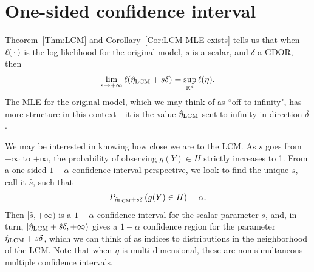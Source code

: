 \section{One-sided confidence interval} \label{S:CI}
Theorem~\ref{Thm:LCM} and Corollary~\ref{Cor:LCM MLE exists} 
tells us that when $\ell(\,\cdot\,)$ is the log likelihood for the original model,
$s$ is a scalar, and $\delta$ a GDOR, then
\begin{align*}
	\lim_{s \to +\infty} \ell(\hat{\eta}_{\textrm{LCM}} + s\delta) = \sup_{{\mathbb R}^d} \ell(\eta).
\end{align*}
The MLE for the original model, which we may think of as ``off to infinity", has
more structure in this context---it is the value $\hat{\eta}_{\textrm{LCM}}$ sent to 
infinity in direction $\delta$.

We may be interested in knowing how close we are to the LCM.
As $s$ goes from $-\infty$ to $+\infty$, the probability of observing 
$g(Y) \in H$ strictly increases to 1.  
From a one-sided $1-\alpha$ confidence interval perspective, 
we look to find the unique $s$, 
call it $\hat{s}$, such that
\begin{align*}
	P_{\hat{\eta}_{\textrm{LCM}} + s\delta}\left (g(Y) \in H \right ) = \alpha.
\end{align*}
Then $[\hat{s}, +\infty)$ is a $1-\alpha$ confidence interval for the scalar parameter 
$s$, and, in turn, $[\hat{\eta}_{\textrm{LCM}} + \hat{s}\delta, +\infty)$ gives 
a $1-\alpha$ confidence region for the parameter $\hat{\eta}_{\textrm{LCM}} + s \delta$, 
which we can think of as indices to distributions in the neighborhood of the LCM.
Note that when $\eta$ is multi-dimensional, these are non-simultaneous 
multiple confidence intervals.


